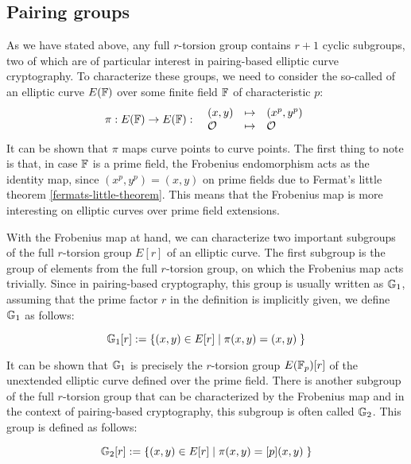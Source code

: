 \subsection{Pairing groups}
\label{sec:pairing_groups}
 As we have stated above, any full $r$-torsion group contains $r+1$ cyclic subgroups, two of which are of particular interest in pairing-based elliptic curve cryptography. To characterize these groups, we need to consider the so-called  of an elliptic curve $E(\mathbb{F})$ over some finite field $\mathbb{F}$ of characteristic $p$:
\begin{equation}\label{eq:frobenius-enomorphism}
\pi : E(\mathbb{F}) \to E(\mathbb{F}): \;\; 
\begin{array}{lcl}
(x,y)       &\mapsto & (x^p,y^p)\\
\mathcal{O} &\mapsto & \mathcal{O}
\end{array} 
\end{equation}
It can be shown that $\pi$ maps curve points to curve points. The first thing to note is that, in case  $\mathbb{F}$ is a prime field, the Frobenius endomorphism acts as the identity map, since $(x^p,y^p) = (x,y)$ on prime fields due to Fermat's little theorem \ref{fermats-little-theorem}. This means that the Frobenius map is more interesting on elliptic curves over prime field extensions.

With the Frobenius map at hand, we can characterize two important subgroups of the full $r$-torsion group $E[r]$ of an elliptic curve. The first subgroup is the group of elements from the full $r$-torsion group, on which the Frobenius map acts trivially. Since in pairing-based cryptography, this group is usually written as $\mathbb{G}_1$, assuming that the prime factor $r$ in the definition is implicitly given, we define $\mathbb{G}_1$ as follows:

\begin{equation}
\label{def:pairing_group_G1}
\mathbb{G}_1[r] := \{(x,y)\in E[r]\;|\; \pi(x,y) = (x,y)\;\}
\end{equation}

It can be shown that $\mathbb{G}_1$ is precisely the $r$-torsion group $E(\mathbb{F}_p)[r]$ of the unextended elliptic curve defined over the prime field. There is another subgroup of the full $r$-torsion group that can be characterized by the Frobenius map and in the context of pairing-based cryptography, this subgroup is often called $\mathbb{G}_2$. This group is defined as follows:

\begin{equation}
\label{def:pairing_group_G2}
\mathbb{G}_2[r]:= \{(x,y)\in E[r]\;|\; \pi(x,y) = [p](x,y)\;\}
\end{equation}

